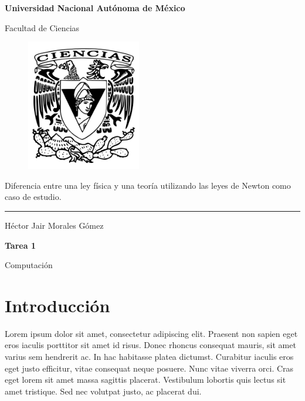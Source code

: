\documentclass[12pt]{article}
\begin{document}
	

\begin{titlepage}
     \begin{center}
     \bigskip
    
    \textbf{Universidad Nacional Autónoma de México}
    
    \bigskip
    \bigskip
    
    Facultad de Ciencias
    
    \bigskip
    \bigskip
    
    

\begin{figure}[htb]
	\centering
	\includegraphics[width=5cm]{ciencias.png}
	\label{fig:ejemplo1}
\end{figure}



    
    
    \begin{Large}
    
      Diferencia entre una ley física y una teoría utilizando las leyes de Newton como caso de estudio.
      
    \end{Large} 
   
    \rule{100mm}{0.5mm}
   
    \bigskip
    \bigskip
   
   Héctor Jair Morales Gómez 
   
   \bigskip
   \bigskip
   
    \textbf{Tarea 1}

    \bigskip
    Computación
\end{center}
\end{titlepage}


\section{Introducción}
Lorem ipsum dolor sit amet, consectetur adipiscing elit. Praesent non sapien eget eros iaculis porttitor sit amet id risus. Donec rhoncus consequat mauris, sit amet varius sem hendrerit ac. In hac habitasse platea dictumst. Curabitur iaculis eros eget justo efficitur, vitae consequat neque posuere. Nunc vitae viverra orci. Cras eget lorem sit amet massa sagittis placerat. Vestibulum lobortis quis lectus sit amet tristique. Sed nec volutpat justo, ac placerat dui. 
\end{document}
